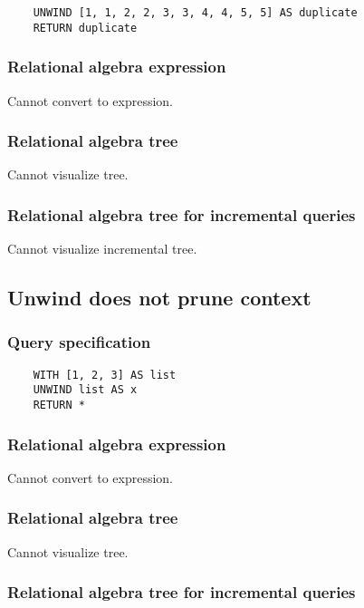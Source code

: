 	\begin{lstlisting}
	UNWIND [1, 1, 2, 2, 3, 3, 4, 4, 5, 5] AS duplicate
	RETURN duplicate
	\end{lstlisting}


	\subsubsection*{Relational algebra expression}

	Cannot convert to expression.

	\subsubsection*{Relational algebra tree}

	Cannot visualize tree.

	\subsubsection*{Relational algebra tree for incremental queries}

	Cannot visualize incremental tree.
	\subsection{Unwind does not prune context}

	\subsubsection*{Query specification}

	\begin{lstlisting}
	WITH [1, 2, 3] AS list
	UNWIND list AS x
	RETURN *
	\end{lstlisting}


	\subsubsection*{Relational algebra expression}

	Cannot convert to expression.

	\subsubsection*{Relational algebra tree}

	Cannot visualize tree.

	\subsubsection*{Relational algebra tree for incremental queries}

